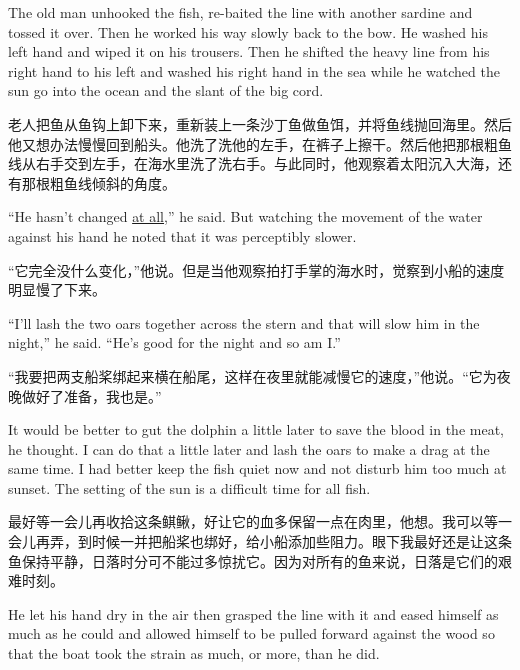 \begin{paracol}{2}
\switchcolumn*


The old man unhooked the fish, re-baited the line with another sardine and
\gls{tossed} it over. Then he worked his way slowly back to the bow. He washed his
left hand and wiped it on his trousers. Then he shifted the heavy line from
his right hand to his left and washed his right hand in the sea while he
watched the sun go into the ocean and the slant of the big cord.

\switchcolumn

老人把鱼从鱼钩上卸下来，重新装上一条沙丁鱼做鱼饵，并将鱼线抛回海里。然后他又想办法慢慢回到船头。他洗了洗他的左手，在裤子上擦干。然后他把那根粗鱼线从右手交到左手，在海水里洗了洗右手。与此同时，他观察着太阳沉入大海，还有那根粗鱼线倾斜的角度。

\switchcolumn*

``He hasn't changed \uline{at all},'' he said. But watching the movement of the
water against his hand he noted that it was \gls{perceptibly} slower.

\switchcolumn

“它完全没什么变化，”他说。但是当他观察拍打手掌的海水时，觉察到小船的速度明显慢了下来。

\switchcolumn*

``I'll \gls{lash} the two oars together across the stern and that will slow
him in the night,'' he said. ``He's good for the night and so am I.''

\switchcolumn

“我要把两支船桨绑起来横在船尾，这样在夜里就能减慢它的速度，”他说。“它为夜晚做好了准备，我也是。”

\switchcolumn*

It would be better to gut the dolphin a little later to save the blood in
the meat, he thought. I can do that a little later and lash the oars to make
a drag at the same time. I had better keep the fish quiet now and not
disturb him too much at sunset. The setting of the sun is a difficult time
for all fish.

\switchcolumn

最好等一会儿再收拾这条鲯鳅，好让它的血多保留一点在肉里，他想。我可以等一会儿再弄，到时候一并把船桨也绑好，给小船添加些阻力。眼下我最好还是让这条鱼保持平静，日落时分可不能过多惊扰它。因为对所有的鱼来说，日落是它们的艰难时刻。

\switchcolumn*

He let his hand dry in the air then \gls{grasped} the line with it and
\gls{eased} himself as much as he could and allowed himself to be pulled
forward against the wood so that the boat took the strain as much, or more,
than he did.


\end{paracol}
